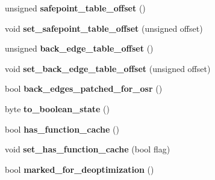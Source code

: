 \begin{DoxyCompactItemize}
\item 
\hypertarget{classv8_1_1internal_1_1_code_a1e5fc5ff12afabdbcac911aed304004d}{}unsigned {\bfseries safepoint\+\_\+table\+\_\+offset} ()\label{classv8_1_1internal_1_1_code_a1e5fc5ff12afabdbcac911aed304004d}

\item 
\hypertarget{classv8_1_1internal_1_1_code_aa8cc331093fa8205a998d8ca5fd5c865}{}void {\bfseries set\+\_\+safepoint\+\_\+table\+\_\+offset} (unsigned offset)\label{classv8_1_1internal_1_1_code_aa8cc331093fa8205a998d8ca5fd5c865}

\item 
\hypertarget{classv8_1_1internal_1_1_code_ad592e3265a49a2888496818936fafa98}{}unsigned {\bfseries back\+\_\+edge\+\_\+table\+\_\+offset} ()\label{classv8_1_1internal_1_1_code_ad592e3265a49a2888496818936fafa98}

\item 
\hypertarget{classv8_1_1internal_1_1_code_a29cd5577ecfc9518ca2f93da18487cd2}{}void {\bfseries set\+\_\+back\+\_\+edge\+\_\+table\+\_\+offset} (unsigned offset)\label{classv8_1_1internal_1_1_code_a29cd5577ecfc9518ca2f93da18487cd2}

\item 
\hypertarget{classv8_1_1internal_1_1_code_ae1edf47fbb5a89705b2630d2d37870ba}{}bool {\bfseries back\+\_\+edges\+\_\+patched\+\_\+for\+\_\+osr} ()\label{classv8_1_1internal_1_1_code_ae1edf47fbb5a89705b2630d2d37870ba}

\item 
\hypertarget{classv8_1_1internal_1_1_code_a134d0c8567e2afcda376a58897ea2468}{}byte {\bfseries to\+\_\+boolean\+\_\+state} ()\label{classv8_1_1internal_1_1_code_a134d0c8567e2afcda376a58897ea2468}

\item 
\hypertarget{classv8_1_1internal_1_1_code_a3c27b547e32431a8e937741c1d76bb67}{}bool {\bfseries has\+\_\+function\+\_\+cache} ()\label{classv8_1_1internal_1_1_code_a3c27b547e32431a8e937741c1d76bb67}

\item 
\hypertarget{classv8_1_1internal_1_1_code_a3974caacaa5349b6e32f140a89162459}{}void {\bfseries set\+\_\+has\+\_\+function\+\_\+cache} (bool flag)\label{classv8_1_1internal_1_1_code_a3974caacaa5349b6e32f140a89162459}

\item 
\hypertarget{classv8_1_1internal_1_1_code_a5d277000c4f328977af13b188359678b}{}bool {\bfseries marked\+\_\+for\+\_\+deoptimization} ()\label{classv8_1_1internal_1_1_code_a5d277000c4f328977af13b188359678b}


\end{DoxyCompactItemize}
